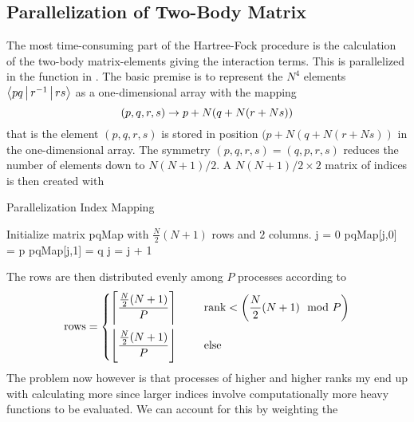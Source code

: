 \subsection{Parallelization of Two-Body Matrix}
    The most time-consuming part of the Hartree-Fock procedure is the
    calculation of the two-body matrix-elements giving the interaction terms.
    This is parallelized in the  function in
    . The basic premise is to represent the $N^4$
    elements $\Braket{pq|r^{-1}|rs}$ as a one-dimensional array with the mapping
        \begin{equation}
            (p,q,r,s) \rightarrow p + N(q + N(r + Ns))
        \end{equation}
    that is the element $(p,q,r,s)$ is stored in position $(p + N(q + N(r +
    Ns))$ in the one-dimensional array. The symmetry $(p,q,r,s)=(q,p,r,s)$
    reduces the number of elements down to $N(N+1)/2$. A $N(N+1)/2\times 2$
    matrix of indices is then created with
        \begin{algorithm}[H]
            \caption{Parallelization Index Mapping}\label{alg:paraindiexmap}
            \begin{algorithmic}[H]
                \State Initialize matrix pqMap with $\frac{N}{2}(N+1)$ rows and
                $2$ columns.
                \State j = 0
                        \State pqMap[j,0] = p
                        \State pqMap[j,1] = q
                        \State j = j + 1
                    \EndFor
                \EndFor
            \end{algorithmic}
        \end{algorithm}
    The rows are then distributed evenly among $P$ processes according to
        \begin{equation}
            \text{rows} = \left\{\begin{aligned}
                \left\lceil\frac{\frac{N}{2}(N+1)}{P}\right\rceil &\indent&
                &\text{rank} < \left(\frac{N}{2}(N+1)\mod P\right) \\
                \left\lfloor\frac{\frac{N}{2}(N+1)}{P}\right\rfloor
                &\indent& &\text{else}
                \end{aligned}\right.
        \end{equation}
    The problem now however is that processes of higher and higher ranks my end
    up with calculating more since larger indices involve computationally more
    heavy functions to be evaluated. We can account for this by weighting the
